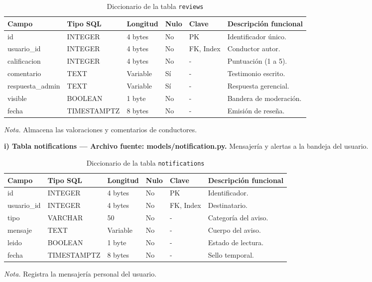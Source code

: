 \begin{table}[htbp]
\caption{Diccionario de la tabla \texttt{reviews}}
\label{tab:dict_reviews}
\begin{tabular}{@{}p{5cm} p{3cm} p{1.5cm} p{1cm} p{1.5cm} p{3.5cm}@{}}
\toprule
\textbf{Campo} & \textbf{Tipo SQL} & \textbf{Longitud} & \textbf{Nulo} & \textbf{Clave} & \textbf{Descripción funcional} \\
\midrule
id & INTEGER & 4 bytes & No & PK & Identificador único. \\
usuario\_id & INTEGER & 4 bytes & No & FK, Index & Conductor autor. \\
calificacion & INTEGER & 4 bytes & No & - & Puntuación (1 a 5). \\
comentario & TEXT & Variable & Sí & - & Testimonio escrito. \\
respuesta\_admin & TEXT & Variable & Sí & - & Respuesta gerencial. \\
visible & BOOLEAN & 1 byte & No & - & Bandera de moderación. \\
fecha & TIMESTAMPTZ & 8 bytes & No & - & Emisión de reseña. \\
\bottomrule
\end{tabular}
\par\vspace{0.2cm}
\textit{Nota.} Almacena las valoraciones y comentarios de conductores.
\end{table}

\textbf{i) Tabla notifications — Archivo fuente: models/notification.py.} Mensajería y alertas a la bandeja del usuario.

\begin{table}[htbp]
\caption{Diccionario de la tabla \texttt{notifications}}
\label{tab:dict_notifications}
\begin{tabular}{@{}p{4cm} p{3cm} p{1.5cm} p{1cm} p{1.5cm} p{4cm}@{}}
\toprule
\textbf{Campo} & \textbf{Tipo SQL} & \textbf{Longitud} & \textbf{Nulo} & \textbf{Clave} & \textbf{Descripción funcional} \\
\midrule
id & INTEGER & 4 bytes & No & PK & Identificador. \\
usuario\_id & INTEGER & 4 bytes & No & FK, Index & Destinatario. \\
tipo & VARCHAR & 50 & No & - & Categoría del aviso. \\
mensaje & TEXT & Variable & No & - & Cuerpo del aviso. \\
leido & BOOLEAN & 1 byte & No & - & Estado de lectura. \\
fecha & TIMESTAMPTZ & 8 bytes & No & - & Sello temporal. \\
\bottomrule
\end{tabular}
\par\vspace{0.2cm}
\textit{Nota.} Registra la mensajería personal del usuario.
\end{table}

